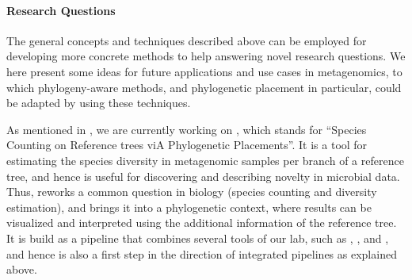 \paragraph{Research Questions}
\label{ch:ConclusionOutlook:par:ResearchQuestions}


The general concepts and techniques described above %
can be employed for developing more concrete methods to help answering novel research questions.
We here present some ideas for future applications and use cases in metagenomics,
to which phylogeny-aware methods, and phylogenetic placement in particular, could be adapted
by using these techniques.

As mentioned in , we are currently working on ,
which stands for ``Species Counting on Reference trees viA Phylogenetic Placements''.
It is a tool for estimating the species diversity in metagenomic samples per branch of a reference tree,
and hence is useful for discovering and describing novelty in microbial data.
Thus,  reworks a common question in biology (species counting and diversity estimation),
and brings it into a phylogenetic context,
where results can be visualized and interpreted using the additional information of the reference tree.
It is build as a pipeline that combines several tools of our lab, such as
 \cite{Barbera2018},  \cite{Morel2019}, and  \cite{Kapli2017},
and hence is also a first step in the direction of integrated pipelines as explained above.


